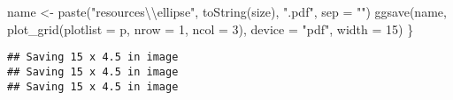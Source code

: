 \documentclass[
]{article}
\newenvironment{Shaded}{\begin{snugshade}}{\end{snugshade}}
\newcommand{\AttributeTok}[1]{\textcolor[rgb]{0.77,0.63,0.00}{#1}}
\newcommand{\DecValTok}[1]{\textcolor[rgb]{0.00,0.00,0.81}{#1}}
\newcommand{\FunctionTok}[1]{\textcolor[rgb]{0.00,0.00,0.00}{#1}}
\newcommand{\NormalTok}[1]{#1}
\newcommand{\OtherTok}[1]{\textcolor[rgb]{0.56,0.35,0.01}{#1}}
\newcommand{\SpecialCharTok}[1]{\textcolor[rgb]{0.00,0.00,0.00}{#1}}
\newcommand{\StringTok}[1]{\textcolor[rgb]{0.31,0.60,0.02}{#1}}
\begin{document}
\begin{Shaded}
\begin{Highlighting}[]
\NormalTok{    name }\OtherTok{\textless{}{-}} \FunctionTok{paste}\NormalTok{(}\StringTok{"resources}\SpecialCharTok{\textbackslash{}\textbackslash{}}\StringTok{ellipse"}\NormalTok{, }\FunctionTok{toString}\NormalTok{(size), }\StringTok{".pdf"}\NormalTok{, }\AttributeTok{sep =} \StringTok{""}\NormalTok{)}
    \FunctionTok{ggsave}\NormalTok{(name, }\FunctionTok{plot\_grid}\NormalTok{(}\AttributeTok{plotlist =}\NormalTok{ p, }\AttributeTok{nrow =} \DecValTok{1}\NormalTok{, }\AttributeTok{ncol =} \DecValTok{3}\NormalTok{), }\AttributeTok{device =} \StringTok{"pdf"}\NormalTok{, }\AttributeTok{width =} \DecValTok{15}\NormalTok{)}
\NormalTok{\}}
\end{Highlighting}
\end{Shaded}

\begin{verbatim}
## Saving 15 x 4.5 in image
## Saving 15 x 4.5 in image
## Saving 15 x 4.5 in image
\end{verbatim}
\end{document}
